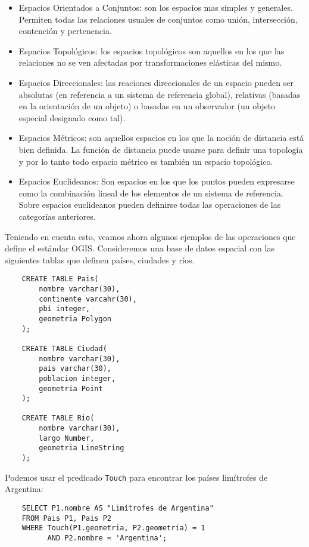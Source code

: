 \begin{itemize}
    \item Espacios Orientados a Conjuntos: son los espacios mas simples y generales.
    Permiten todas las relaciones usuales de conjuntos como unión, intersección, contención y pertenencia.
    \item Espacios Topológicos: los espacios topológicos son aquellos en los que las relaciones no se ven afectadas
    por transformaciones elásticas del mismo.
    \item Espacios Direccionales: las reaciones direccionales de un espacio pueden ser
    absolutas (en referencia a un sistema de referencia global),
    relativas (basadas en la orientación de un objeto)
    o basadas en un observador (un objeto especial designado como tal).
    \item Espacios Métricos: son aquellos espacios en los que la noción de distancia está bien definida. La función de distancia puede usarse
    para definir una topología y por lo tanto todo espacio métrico es también un espacio topológico.
    \item Espacios Euclideanos: Son espacios en los que los puntos pueden expresarse como la combinación lineal de los elementos de
    un sistema de referencia. Sobre espacios euclideanos pueden definirse todas las operaciones de las categorías anteriores.
\end{itemize}

Teniendo en cuenta esto, veamos ahora algunos ejemplos de las operaciones que define el estándar OGIS.
Consideremos una base de datos espacial con las siguientes tablas que definen países, ciudades y ríos.

\begin{verbatim}
    CREATE TABLE Pais(
        nombre varchar(30),
        continente varcahr(30),
        pbi integer,
        geometria Polygon
    );

    CREATE TABLE Ciudad(
        nombre varchar(30),
        pais varchar(30),
        poblacion integer,
        geometria Point
    );

    CREATE TABLE Rio(
        nombre varchar(30),
        largo Number,
        geometria LineString
    );
\end{verbatim}

Podemos usar el predicado \texttt{Touch} para encontrar los países limítrofes de Argentina:

\begin{verbatim}
    SELECT P1.nombre AS "Limítrofes de Argentina"
    FROM Pais P1, Pais P2
    WHERE Touch(P1.geometria, P2.geometria) = 1
          AND P2.nombre = 'Argentina';
\end{verbatim}


